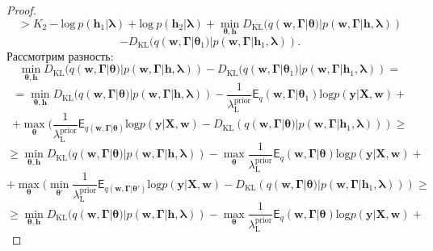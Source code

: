 \begin{proof}
\[\]
\[
>K_2 -\text{log}~p (\mathbf{h}_1|\boldsymbol{\lambda})+\text{log}~p (\mathbf{h}_2|\boldsymbol{\lambda}) + \min_{\boldsymbol{\theta}, \mathbf{h}} D_\text{KL}(q(\mathbf{w}, \boldsymbol{\Gamma}|\boldsymbol{\theta})|p(\mathbf{w}, \boldsymbol{\Gamma}|\mathbf{h}, \boldsymbol{\lambda})) 
\]
\[
-  D_\text{KL}(q(\mathbf{w}, \boldsymbol{\Gamma}|\boldsymbol{\theta}_1)|p(\mathbf{w}, \boldsymbol{\Gamma}|\mathbf{h}_1, \boldsymbol{\lambda})).
\]
Рассмотрим разность:
\[\min_{\boldsymbol{\theta}, \mathbf{h}} D_\text{KL}(q(\mathbf{w}, \boldsymbol{\Gamma}|\boldsymbol{\theta})|p(\mathbf{w}, \boldsymbol{\Gamma}|\mathbf{h}, \boldsymbol{\lambda}))  - D_\text{KL}(q(\mathbf{w}, \boldsymbol{\Gamma}|\boldsymbol{\theta}_1)|p(\mathbf{w}, \boldsymbol{\Gamma}|\mathbf{h}_1, \boldsymbol{\lambda})) =
\]
\[
= \min_{\boldsymbol{\theta}, \mathbf{h}} D_\text{KL}(q(\mathbf{w}, \boldsymbol{\Gamma}|\boldsymbol{\theta})|p(\mathbf{w}, \boldsymbol{\Gamma}|\mathbf{h}, \boldsymbol{\lambda}))  - \frac{1}{\lambda^\text{prior}_\text{L}}\mathsf{E}_q(\mathbf{w}, \boldsymbol{\Gamma}|\boldsymbol{\theta}_1) \text{log} p(\mathbf{y}|\mathbf{X}, \mathbf{w}) +
\]
\[
+ \max_{\boldsymbol{\theta}}  (\frac{1}{\lambda^\text{prior}_\text{L}}\mathsf{E}_{q(\mathbf{w}, \boldsymbol{\Gamma}|\boldsymbol{\theta})} \text{log} p(\mathbf{y}|\mathbf{X}, \mathbf{w}) - D_\text{KL}(q(\mathbf{w}, \boldsymbol{\Gamma}|\boldsymbol{\theta})|p(\mathbf{w}, \boldsymbol{\Gamma}|\mathbf{h}_1, \boldsymbol{\lambda}))) \geq
\]
\[
    \geq \min_{\boldsymbol{\theta}, \mathbf{h}} D_\text{KL}(q(\mathbf{w}, \boldsymbol{\Gamma}|\boldsymbol{\theta})|p(\mathbf{w}, \boldsymbol{\Gamma}|\mathbf{h}, \boldsymbol{\lambda})) - \max_{\boldsymbol{\theta}}\frac{1}{\lambda^\text{prior}_\text{L}}\mathsf{E}_q(\mathbf{w}, \boldsymbol{\Gamma}|\boldsymbol{\theta}) \text{log} p(\mathbf{y}|\mathbf{X}, \mathbf{w}) +
\]
\[ + \max_{\boldsymbol{\theta}}  (\min_{\boldsymbol{\theta}'} \frac{1}{\lambda^\text{prior}_\text{L}}\mathsf{E}_{q(\mathbf{w}, \boldsymbol{\Gamma}|\boldsymbol{\theta'})} \text{log} p(\mathbf{y}|\mathbf{X}, \mathbf{w}) - D_\text{KL}(q(\mathbf{w}, \boldsymbol{\Gamma}|\boldsymbol{\theta})|p(\mathbf{w}, \boldsymbol{\Gamma}|\mathbf{h}_1, \boldsymbol{\lambda})))  \geq
\]
\[
 \geq
\min_{\boldsymbol{\theta}, \mathbf{h}} D_\text{KL}(q(\mathbf{w}, \boldsymbol{\Gamma}|\boldsymbol{\theta})|p(\mathbf{w}, \boldsymbol{\Gamma}|\mathbf{h}, \boldsymbol{\lambda})) - \max_{\boldsymbol{\theta}}\frac{1}{\lambda^\text{prior}_\text{L}}\mathsf{E}_q(\mathbf{w}, \boldsymbol{\Gamma}|\boldsymbol{\theta}) \text{log} p(\mathbf{y}|\mathbf{X}, \mathbf{w}) +
\]
\end{proof}

